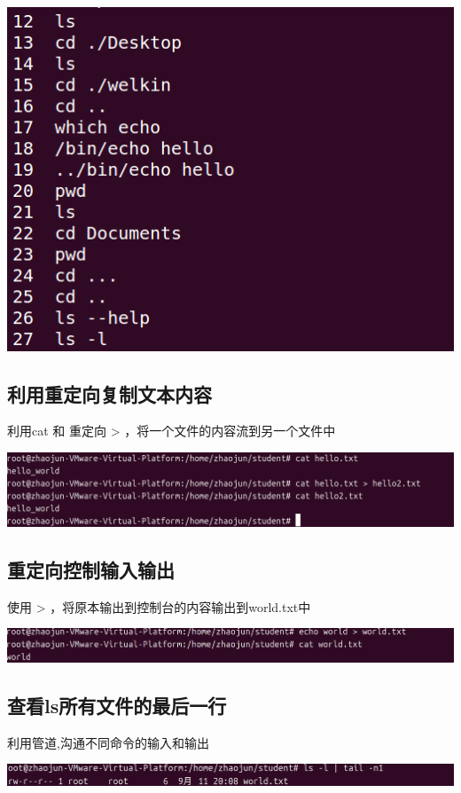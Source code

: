 \documentclass[UTF8,a4paper]{ctexart}
\begin{document}
\begin{sloppypar}
	\includegraphics[width = 16cm]{7}
	
	\subsection{利用重定向复制文本内容}
	利用cat 和 重定向 > ，将一个文件的内容流到另一个文件中
	
	\includegraphics[width = 16cm]{8}
	
	\subsection{重定向控制输入输出}
	使用 > ，将原本输出到控制台的内容输出到world.txt中
	
	\includegraphics[width = 16cm]{9}
	
	\subsection{查看ls所有文件的最后一行}
	利用管道\textbar,沟通不同命令的输入和输出
	
	\includegraphics[width = 16cm]{10}
	

\end{sloppypar}
\end{document}

